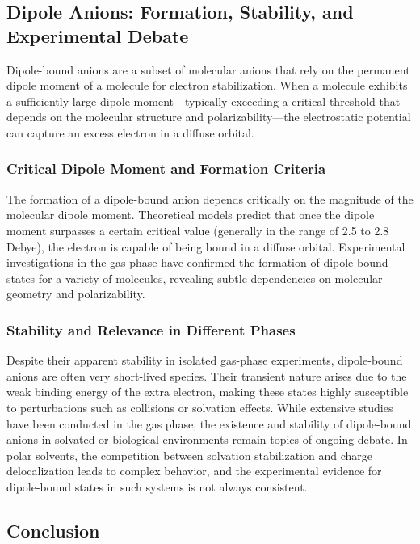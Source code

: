 \subsection{Dipole Anions: Formation, Stability, and Experimental Debate}

Dipole-bound anions are a subset of molecular anions that rely on the permanent dipole moment of a molecule for electron stabilization. When a molecule exhibits a sufficiently large dipole moment—typically exceeding a critical threshold that depends on the molecular structure and polarizability—the electrostatic potential can capture an excess electron in a diffuse orbital.

\subsubsection{Critical Dipole Moment and Formation Criteria}

The formation of a dipole-bound anion depends critically on the magnitude of the molecular dipole moment. Theoretical models predict that once the dipole moment surpasses a certain critical value (generally in the range of 2.5 to 2.8 Debye), the electron is capable of being bound in a diffuse orbital. Experimental investigations in the gas phase have confirmed the formation of dipole-bound states for a variety of molecules, revealing subtle dependencies on molecular geometry and polarizability.

\subsubsection{Stability and Relevance in Different Phases}

Despite their apparent stability in isolated gas-phase experiments, dipole-bound anions are often very short-lived species. Their transient nature arises due to the weak binding energy of the extra electron, making these states highly susceptible to perturbations such as collisions or solvation effects. While extensive studies have been conducted in the gas phase, the existence and stability of dipole-bound anions in solvated or biological environments remain topics of ongoing debate. In polar solvents, the competition between solvation stabilization and charge delocalization leads to complex behavior, and the experimental evidence for dipole-bound states in such systems is not always consistent.

\subsection{Conclusion}

